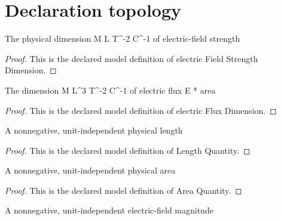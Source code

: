 \section{Declaration topology}
\begin{definition}
  \label{def:physics:phyx-mini-0999:phyxminiproblems-problemphyxmini0999-electricfieldstrengthdimension}
  The physical dimension M L T\textasciicircum{}-2 C\textasciicircum{}-1 of electric-field strength
\end{definition}
\begin{proof}
  This is the declared model definition of electric Field Strength Dimension.
\end{proof}
\begin{definition}
  \label{def:physics:phyx-mini-0999:phyxminiproblems-problemphyxmini0999-electricfluxdimension}
  The dimension M L\textasciicircum{}3 T\textasciicircum{}-2 C\textasciicircum{}-1 of electric flux E * area
\end{definition}
\begin{proof}
  This is the declared model definition of electric Flux Dimension.
\end{proof}
\begin{definition}
  \label{def:physics:phyx-mini-0999:phyxminiproblems-problemphyxmini0999-lengthquantity}
  A nonnegative, unit-independent physical length
\end{definition}
\begin{proof}
  This is the declared model definition of Length Quantity.
\end{proof}
\begin{definition}
  \label{def:physics:phyx-mini-0999:phyxminiproblems-problemphyxmini0999-areaquantity}
  A nonnegative, unit-independent physical area
\end{definition}
\begin{proof}
  This is the declared model definition of Area Quantity.
\end{proof}
\begin{definition}
  \label{def:physics:phyx-mini-0999:phyxminiproblems-problemphyxmini0999-electricfieldmagnitudequantity}
  A nonnegative, unit-independent electric-field magnitude
\end{definition}
